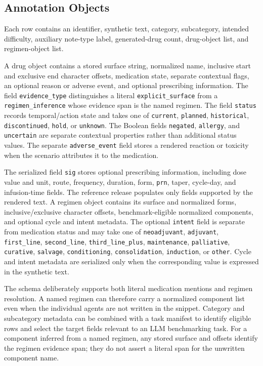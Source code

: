 \documentclass[conference]{IEEEtran}
\newcommand{\code}[1]{\texttt{#1}}
\begin{document}
\subsection{Annotation Objects}

Each row contains an identifier, synthetic text, category, subcategory,
intended difficulty, auxiliary note-type label, generated-drug count,
drug-object list, and regimen-object list.

A drug object contains a stored surface string, normalized name, inclusive
start and exclusive end character offsets, medication state, separate
contextual flags, an optional reason or adverse event, and optional prescribing
information. The field \code{evidence\_type} distinguishes a literal
\code{explicit\_surface} from a \code{regimen\_inference} whose evidence span
is the named regimen. The field \code{status} records temporal/action state and takes
one of \code{current}, \code{planned}, \code{historical},
\code{discontinued}, \code{hold}, or \code{unknown}. The Boolean fields
\code{negated}, \code{allergy}, and \code{uncertain} are separate contextual
properties rather than additional status values. The separate
\code{adverse\_event} field stores a rendered reaction or toxicity when the
scenario attributes it to the medication.

The serialized field \code{sig} stores optional prescribing information,
including dose value and unit, route, frequency, duration, form, \code{prn},
taper, cycle-day, and infusion-time fields. The reference release populates
only fields supported by the rendered text. A regimen object contains its
surface and normalized forms, inclusive/exclusive character offsets,
benchmark-eligible normalized components, and optional cycle and intent
metadata. The optional \code{intent} field is separate from medication status
and may take one of \code{neoadjuvant}, \code{adjuvant}, \code{first\_line},
\code{second\_line}, \code{third\_line\_plus}, \code{maintenance},
\code{palliative}, \code{curative}, \code{salvage}, \code{conditioning},
\code{consolidation}, \code{induction}, or \code{other}. Cycle and intent
metadata are serialized only when the corresponding value is expressed in the
synthetic text.

The schema deliberately supports both literal medication mentions and regimen
resolution. A named regimen can therefore carry a normalized component list
even when the individual agents are not written in the snippet. Category and
subcategory metadata can be combined with a task manifest to identify eligible
rows and select the target fields relevant to an LLM benchmarking task. For a
component inferred from a named regimen, any stored surface and offsets identify
the regimen evidence span; they do not assert a literal span for the unwritten
component name.
\end{document}
